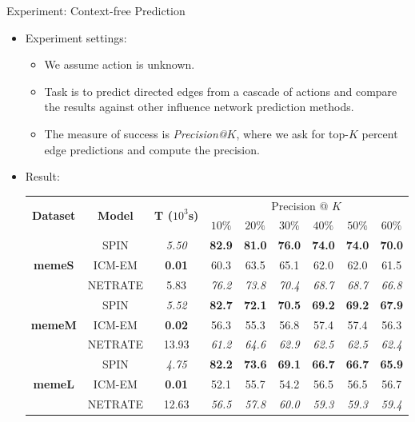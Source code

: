 \documentclass[first=dgreen,second=purple,logo=yellowexc]{aaltoslides}
\begin{document}
\begin{frame}{Experiment: Context-free Prediction}
	\begin{itemize}
		\item Experiment settings:
			\begin{itemize}
				\item We assume action is unknown.
				\item Task is to predict directed edges from a cascade of actions and compare the results against other influence network prediction methods.
				\item The measure of success is {\em Precision@$K$}, where we ask for top-$K$ percent edge predictions and compute the precision.
			\end{itemize}
		\item Result:
			\begin{table}[t]
			\scriptsize
			\centering
			\begin{tabular}{|@{ }c@{ }|@{ }c@{ }|@{ }c@{ }|@{ }c@{ }|@{ }c@{ }|@{ }c@{ }|@{ }c@{ }|@{ }c@{ }|@{ }c@{ }|}
			  \hline
			\multirow{2}{*}{\textbf{Dataset}} & \multirow{2}{*}{\textbf{Model}} & \multirow{2}{*}{\textbf{T ({\tiny$10^3$s})}} & \multicolumn{6}{c|}{Precision @ $K$} \\ \cline{4-9}
			 & & & {$10\%$} & {$20\%$} & {$30\%$} & {$40\%$} & {$50\%$} & {$60\%$} \\ \hline
			\multirow{3}{*}{\textbf{memeS}}
			& SPIN & \em{5.50} & \textbf{82.9} & \textbf{81.0} & \textbf{76.0} & \textbf{74.0} & \textbf{74.0} & \textbf{70.0}  \\  
			& ICM-EM & \textbf{0.01} & {60.3} & {63.5} & {65.1} & {62.0} & {62.0} & {61.5}  \\ 
			& NETRATE & {5.83} & \em{76.2} & \em{73.8} & \em{70.4} & \em{68.7} & \em{68.7} & \em{66.8} \\ \hline 
			\multirow{3}{*}{\textbf{memeM}}
			& SPIN & \em{5.52} & \textbf{82.7} & \textbf{72.1} & \textbf{70.5} & \textbf{69.2} & \textbf{69.2} & \textbf{67.9}  \\  
			& ICM-EM & \textbf{0.02} & {56.3} & {55.3} & {56.8} & {57.4} & {57.4} & {56.3}  \\ 
			& NETRATE & {13.93} & \em{61.2} & \em{64.6} & \em{62.9} & \em{62.5} & \em{62.5} & \em{62.4}  \\ \hline 
			\multirow{3}{*}{\textbf{memeL}}
			& SPIN & \em{4.75} & \textbf{82.2} & \textbf{73.6} & \textbf{69.1} & \textbf{66.7} & \textbf{66.7} & \textbf{65.9}  \\  
			& ICM-EM & \textbf{0.01} & {52.1} & {55.7} & {54.2} & {56.5} & {56.5} & {56.7}  \\ 
			& NETRATE & {12.63} & \em{56.5} & \em{57.8} & \em{60.0} & \em{59.3} & \em{59.3} & \em{59.4}  \\ \hline
			\end{tabular}
			\end{table}
	\end{itemize}
\end{frame}
\end{document}
